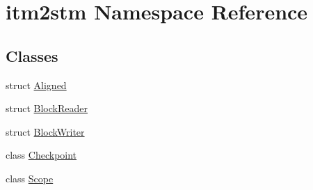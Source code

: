 \hypertarget{namespaceitm2stm}{\section{itm2stm Namespace Reference}
\label{namespaceitm2stm}
}
\subsection*{Classes}
\begin{DoxyCompactItemize}
\item 
struct \hyperlink{structitm2stm_1_1Aligned}{Aligned}
\item 
struct \hyperlink{structitm2stm_1_1BlockReader}{Block\-Reader}
\item 
struct \hyperlink{structitm2stm_1_1BlockWriter}{Block\-Writer}
\item 
class \hyperlink{classitm2stm_1_1Checkpoint}{Checkpoint}
\item 
class \hyperlink{classitm2stm_1_1Scope}{Scope}
\end{DoxyCompactItemize}
